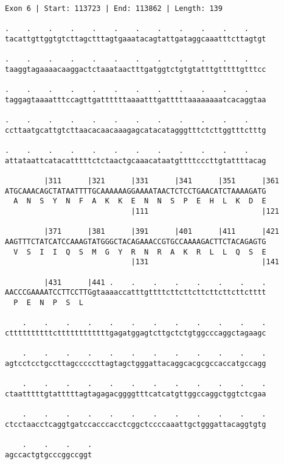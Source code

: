 \documentclass{article}
\begin{document}
\begin{Verbatim}[fontfamily=courier]
Exon 6 | Start: 113723 | End: 113862 | Length: 139

.    .    .    .    .    .    .    .    .    .    .    .    
tacattgttggtgtcttagctttagtgaaatacagtattgataggcaaatttcttagtgt

.    .    .    .    .    .    .    .    .    .    .    .    
taaggtagaaaacaaggactctaaataactttgatggtctgtgtatttgtttttgtttcc

.    .    .    .    .    .    .    .    .    .    .    .    
taggagtaaaatttccagttgattttttaaaatttgatttttaaaaaaaatcacaggtaa

.    .    .    .    .    .    .    .    .    .    .    .    
ccttaatgcattgtcttaacacaacaaagagcatacatagggtttctcttggtttctttg

.    .    .    .    .    .    .    .    .    .    .    .    
attataattcatacatttttctctaactgcaaacataatgttttcccttgtattttacag

         |311      |321      |331      |341      |351      |361
ATGCAAACAGCTATAATTTTGCAAAAAAGGAAAATAACTCTCCTGAACATCTAAAAGATG
  A  N  S  Y  N  F  A  K  K  E  N  N  S  P  E  H  L  K  D  E
                             |111                          |121

         |371      |381      |391      |401      |411      |421
AAGTTTCTATCATCCAAAGTATGGGCTACAGAAACCGTGCCAAAAGACTTCTACAGAGTG
  V  S  I  I  Q  S  M  G  Y  R  N  R  A  K  R  L  L  Q  S  E
                             |131                          |141

         |431      |441 .    .    .    .    .    .    .    .
AACCCGAAAATCCTTCCTTGgtaaaaccatttgttttcttcttcttcttcttcttctttt
  P  E  N  P  S  L                                          

    .    .    .    .    .    .    .    .    .    .    .    .
cttttttttttcttttttttttttgagatggagtcttgctctgtggcccaggctagaagc

    .    .    .    .    .    .    .    .    .    .    .    .
agtcctcctgccttagcccccttagtagctgggattacaggcacgcgccaccatgccagg

    .    .    .    .    .    .    .    .    .    .    .    .
ctaatttttgtatttttagtagagacggggtttcatcatgttggccaggctggtctcgaa

    .    .    .    .    .    .    .    .    .    .    .    .
ctcctaacctcaggtgatccacccacctcggctccccaaattgctgggattacaggtgtg

    .    .    .    .
agccactgtgcccggccggt
\end{Verbatim}
\newpage
\end{document}
